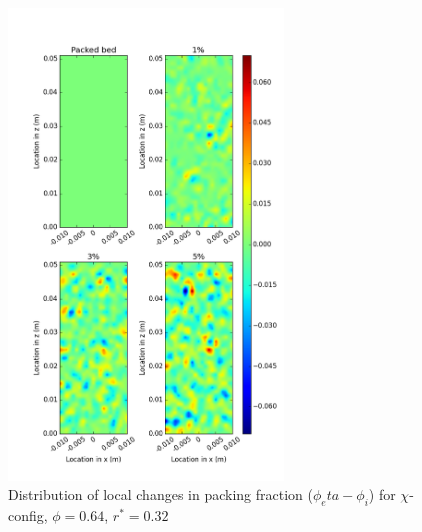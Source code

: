 \begin{figure}[!t]
    \centering
    \includegraphics[width = 0.65\textwidth]{figures/x-62-r23-1-deltas.png}
    \caption{Distribution of local changes in packing fraction ($\phi_eta - \phi_i$) for $\chi$-config, $\phi = 0.64$, $r^* = 0.32$}\label{fig:x-624-r23-deltas}
\end{figure}

